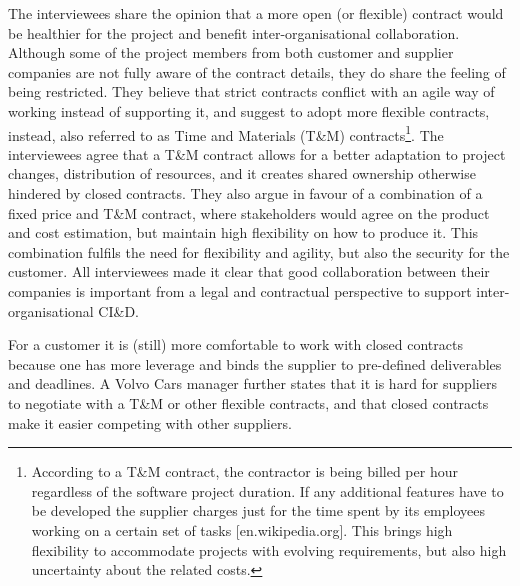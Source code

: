  The interviewees share the opinion that a more open (or flexible) contract would be healthier for the project and benefit inter-organisational collaboration. Although some of the project members from both customer and supplier companies are not fully aware of the contract details, they do share the feeling of being restricted. They believe that strict contracts conflict with an agile way of working instead of supporting it, and suggest to adopt more flexible contracts, instead, also referred to as Time and Materials (T\&M) contracts\footnote{According to a T\&M contract, the contractor is being billed per hour regardless of the software project duration. If any additional features have to be developed the supplier charges just for the time spent by its employees working on a certain set of tasks [en.wikipedia.org]. This brings high flexibility to accommodate projects with evolving requirements, but also high uncertainty about the related costs.}. 
The interviewees agree that a T\&M contract allows for a better adaptation to project changes, distribution of resources, and it creates shared ownership otherwise hindered by closed contracts. They also argue in favour of a combination of a fixed price and T\&M contract, where stakeholders would agree on the product and cost estimation, but maintain high flexibility on how to produce it. This combination fulfils the need for flexibility and agility, but also the security for the customer. All interviewees made it clear that good collaboration between their companies is important from a legal and contractual perspective to support inter-organisational CI\&D.


 For a customer it is (still) more comfortable to work with closed contracts because one has more leverage and binds the supplier to pre-defined deliverables and deadlines. A Volvo Cars manager %
further states that it is hard for suppliers to negotiate with a T\&M or other flexible contracts, and that closed contracts make it easier competing with other suppliers.


